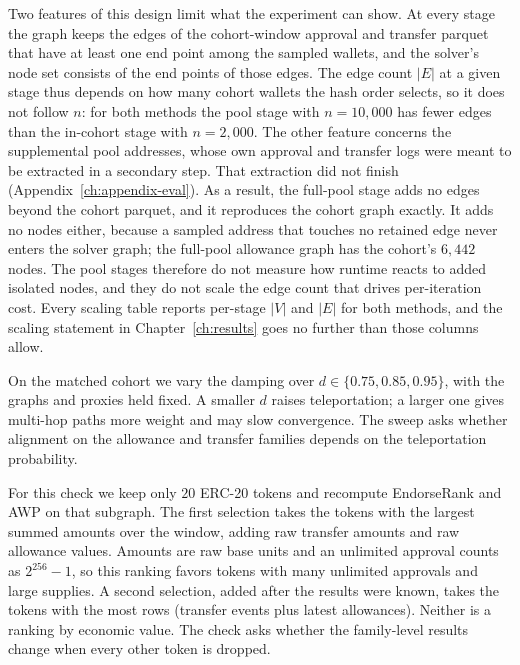 Two features of this design limit what the experiment can show. At every stage the graph keeps the edges of the cohort-window approval and transfer parquet that have at least one end point among the sampled wallets, and the solver's node set consists of the end points of those edges. The edge count $|E|$ at a given stage thus depends on how many cohort wallets the hash order selects, so it does not follow $n$: for both methods the pool stage with $n=10{,}000$ has fewer edges than the in-cohort stage with $n=2{,}000$. The other feature concerns the supplemental pool addresses, whose own approval and transfer logs were meant to be extracted in a secondary step. That extraction did not finish (Appendix~\ref{ch:appendix-eval}). As a result, the full-pool stage adds no edges beyond the cohort parquet, and it reproduces the cohort graph exactly. It adds no nodes either, because a sampled address that touches no retained edge never enters the solver graph; the full-pool allowance graph has the cohort's $6{,}442$ nodes. The pool stages therefore do not measure how runtime reacts to added isolated nodes, and they do not scale the edge count that drives per-iteration cost. Every scaling table reports per-stage $|V|$ and $|E|$ for both methods, and the scaling statement in Chapter~\ref{ch:results} goes no further than those columns allow.


On the matched cohort we vary the damping over $d\in\{0.75,0.85,0.95\}$, with the graphs and proxies held fixed. A smaller $d$ raises teleportation; a larger one gives multi-hop paths more weight and may slow convergence. The sweep asks whether alignment on the allowance and transfer families depends on the teleportation probability.


For this check we keep only $20$ ERC-20 tokens and recompute EndorseRank and AWP on that subgraph. The first selection takes the tokens with the largest summed amounts over the window, adding raw transfer amounts and raw allowance values. Amounts are raw base units and an unlimited approval counts as $2^{256}-1$, so this ranking favors tokens with many unlimited approvals and large supplies. A second selection, added after the results were known, takes the tokens with the most rows (transfer events plus latest allowances). Neither is a ranking by economic value. The check asks whether the family-level results change when every other token is dropped.

